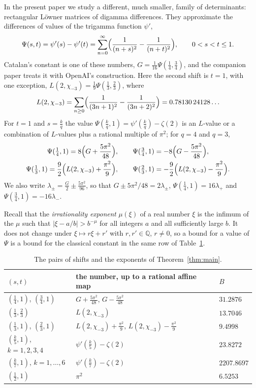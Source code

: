 \documentclass[11pt]{amsart}
\theoremstyle{definition}
\theoremstyle{remark}
\numberwithin{equation}{section}
\newcommand{\Q}{\mathbb Q}
\newcommand{\MuLamU}{31.2876}
\newcommand{\MuThirdsU}{9.4998}
\newcommand{\MuFifthsU}{23.8272}
\newcommand{\MuSeventhsU}{2207.8697}
\newcommand{\MuChi}{13.7046}
\newcommand{\MuHalvesU}{6.5253}
\begin{document}
In the present paper we study a different, much smaller, family of determinants: rectangular
L\"owner matrices of digamma differences. They approximate the differences of values of the trigamma
function $\psi'$,
\[
 \Psi(s,t)=\psi'(s)-\psi'(t)=\sum_{n=0}^\infty\Bigl(\frac1{(n+s)^2}-\frac1{(n+t)^2}\Bigr),\qquad 0<s<t\le1 .
\]
Catalan's constant is one of these numbers, $G=\frac1{16}\Psi(\frac14,\frac34)$, and the companion paper
\cite{Litsey2026} treats it with OpenAI's construction. Here the second shift is $t=1$, with one exception,
$L(2,\chi_{-3})=\frac19\Psi(\frac13,\frac23)$, where
\[
 L(2,\chi_{-3})=\sum_{n\ge0}\Bigl(\frac1{(3n+1)^2}-\frac1{(3n+2)^2}\Bigr)=0.78130\,24128\ldots
\]
For $t=1$ and $s=\frac kq$ the value $\Psi(\frac kq,1)=\psi'(\frac kq)-\zeta(2)$ is an $L$-value or a
combination of $L$-values plus a rational multiple of $\pi^2$; for $q=4$ and $q=3$,
\begin{gather*}
 \Psi(\tfrac14,1)=8\Bigl(G+\frac{5\pi^2}{48}\Bigr),\qquad \Psi(\tfrac34,1)=-8\Bigl(G-\frac{5\pi^2}{48}\Bigr),\\
 \Psi(\tfrac13,1)=\frac92\Bigl(L(2,\chi_{-3})+\frac{\pi^2}9\Bigr),\qquad
 \Psi(\tfrac23,1)=-\frac92\Bigl(L(2,\chi_{-3})-\frac{\pi^2}9\Bigr).
\end{gather*}
We also write $\lambda_\pm=\frac G2\pm\frac{5\pi^2}{96}$, so that $G\pm5\pi^2/48=2\lambda_\pm$,
$\Psi(\frac14,1)=16\lambda_+$ and $\Psi(\frac34,1)=-16\lambda_-$.

Recall that the \emph{irrationality exponent} $\mu(\xi)$ of a real number $\xi$ is the
infimum of the $\mu$ such that $|\xi-a/b|>b^{-\mu}$ for all integers $a$ and all
sufficiently large $b$. It does not change under $\xi\mapsto r\xi+r'$ with $r,r'\in\Q$, $r\ne0$, so a
bound for a value of $\Psi$ is a bound for the classical constant in the same row of
Table~\ref{tab:main}.

\begin{table}[ht]
\centering
\begin{tabular}{@{}lll@{}}
\toprule
$(s,t)$ & the number, up to a rational affine map & $B$ \\
\midrule
$(\frac14,1)$, $(\frac34,1)$ & $G+\frac{5\pi^2}{48}$, $G-\frac{5\pi^2}{48}$ & $\MuLamU$ \\
$(\frac13,\frac23)$ & $L(2,\chi_{-3})$ & $\MuChi$ \\
$(\frac13,1)$, $(\frac23,1)$ & $L(2,\chi_{-3})+\frac{\pi^2}9$, $L(2,\chi_{-3})-\frac{\pi^2}9$ & $\MuThirdsU$ \\
$(\frac k5,1)$, $k=1,2,3,4$ & $\psi'(\frac k5)-\zeta(2)$ & $\MuFifthsU$ \\
$(\frac k7,1)$, $k=1,\dots,6$ & $\psi'(\frac k7)-\zeta(2)$ & $\MuSeventhsU$ \\
$(\frac12,1)$ & $\pi^2$ & $\MuHalvesU$ \\
\bottomrule
\end{tabular}
\caption{The pairs of shifts and the exponents of Theorem~\ref{thm:main}.}\label{tab:main}
\end{table}
\end{document}
